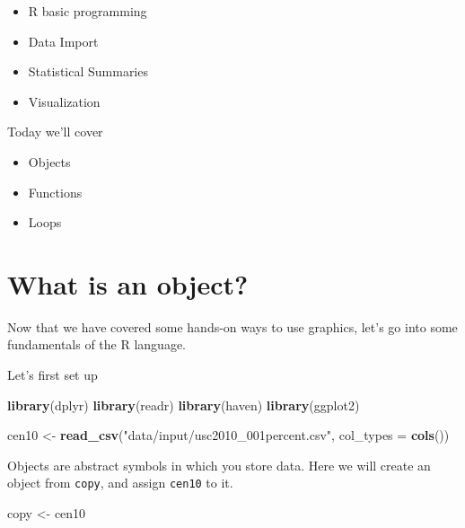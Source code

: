 \documentclass[]{book}
\newenvironment{Shaded}{\begin{snugshade}}{\end{snugshade}}
\newcommand{\KeywordTok}[1]{\textcolor[rgb]{0.13,0.29,0.53}{\textbf{#1}}}
\newcommand{\DataTypeTok}[1]{\textcolor[rgb]{0.13,0.29,0.53}{#1}}
\newcommand{\StringTok}[1]{\textcolor[rgb]{0.31,0.60,0.02}{#1}}
\newcommand{\NormalTok}[1]{#1}
\providecommand{\tightlist}{%
  \setlength{\itemsep}{0pt}\setlength{\parskip}{0pt}}
\theoremstyle{definition}
\theoremstyle{definition}
\theoremstyle{definition}
\theoremstyle{remark}
\begin{document}
\begin{itemize}
\tightlist
\item
  R basic programming
\item
  Data Import
\item
  Statistical Summaries
\item
  Visualization
\end{itemize}

Today we'll cover

\begin{itemize}
\tightlist
\item
  Objects
\item
  Functions
\item
  Loops
\end{itemize}

\section{What is an object?}\label{what-is-an-object}

Now that we have covered some hands-on ways to use graphics, let's go
into some fundamentals of the R language.

Let's first set up

\begin{Shaded}
\begin{Highlighting}[]
\KeywordTok{library}\NormalTok{(dplyr)}
\KeywordTok{library}\NormalTok{(readr)}
\KeywordTok{library}\NormalTok{(haven)}
\KeywordTok{library}\NormalTok{(ggplot2)}
\end{Highlighting}
\end{Shaded}

\begin{Shaded}
\begin{Highlighting}[]
\NormalTok{cen10 <-}\StringTok{ }\KeywordTok{read_csv}\NormalTok{(}\StringTok{"data/input/usc2010_001percent.csv"}\NormalTok{, }\DataTypeTok{col_types =} \KeywordTok{cols}\NormalTok{())}
\end{Highlighting}
\end{Shaded}

Objects are abstract symbols in which you store data. Here we will
create an object from \texttt{copy}, and assign \texttt{cen10} to it.

\begin{Shaded}
\begin{Highlighting}[]
\NormalTok{copy <-}\StringTok{ }\NormalTok{cen10 }
\end{Highlighting}
\end{Shaded}
\end{document}
